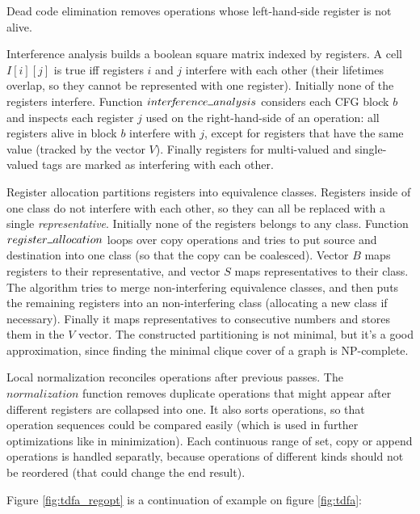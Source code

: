 \documentclass[]{article}
\newcommand{\Xund}{\rule{.5em}{.5pt}}
\begin{document}
Dead code elimination removes operations whose left-hand-side register is not alive.
\medskip

Interference analysis builds a boolean square matrix indexed by registers.
A cell $I[i][j]$ is true iff registers $i$ and $j$ interfere with each other
(their lifetimes overlap, so they cannot be represented with one register).
Initially none of the registers interfere.
Function $inter\!f\!erence \Xund analysis$ considers each CFG block $b$ and inspects each register $j$ used on the right-hand-side of an operation:
all registers alive in block $b$ interfere with $j$,
except for registers that have the same value (tracked by the vector $V$).
Finally registers for multi-valued and single-valued tags are marked as interfering with each other.
\medskip

Register allocation partitions registers into equivalence classes.
Registers inside of one class do not interfere with each other, so they can all be replaced with a single \emph{representative}.
Initially none of the registers belongs to any class.
Function $register \Xund allocation$ loops over copy operations
and tries to put source and destination into one class (so that the copy can be coalesced).
Vector $B$ maps registers to their representative, and vector $S$ maps representatives to their class.
The algorithm tries to merge non-interfering equivalence classes,
and then puts the remaining registers into an non-interfering class (allocating a new class if necessary).
Finally it maps representatives to consecutive numbers and stores them in the $V$ vector.
The constructed partitioning is not minimal, but it's a good approximation,
since finding the minimal clique cover of a graph is NP-complete.
\medskip

Local normalization reconciles operations after previous passes.
The $normalization$ function removes duplicate operations that might appear after different registers are collapsed into one.
It also sorts operations, so that operation sequences could be compared easily
(which is used in further optimizations like in minimization).
Each continuous range of set, copy or append operations is handled separatly,
because operations of different kinds should not be reordered (that could change the end result).
\medskip

Figure \ref{fig:tdfa_regopt} is a continuation of example on figure \ref{fig:tdfa}:
\medskip
\end{document}
